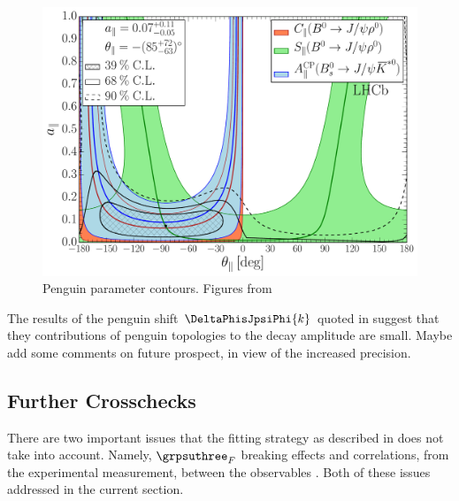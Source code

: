 \begin{figure}[h]
\begin{center}
  \includegraphics[trim=0.0cm 0.0cm 0.0cm 0.0cm, clip=true,scale=0.33]{Figures/Chapter5/Penguin_Contribution_Ang_vs_Abs_allB2VV_Para.pdf}
  \caption{Penguin parameter contours. Figures from~\cite{DeBruyn-thesis}}
  \label{pengPlot_para}
\end{center}
\end{figure}


The results of the penguin shift $\DeltaPhisJpsiPhi{k}$ quoted in 
suggest that they contributions of penguin topologies to the \BsJpsiPhi decay amplitude are small.
{\color{red} Maybe add some comments on future prospect, in view of the increased precision.}

\subsection{Further Crosschecks}
There are two important issues that the fitting strategy as described in 
does not take into account. Namely, $\grpsuthree_F$ breaking effects and correlations, from the
experimental measurement, between the observables . Both of these issues
addressed in the current section.

